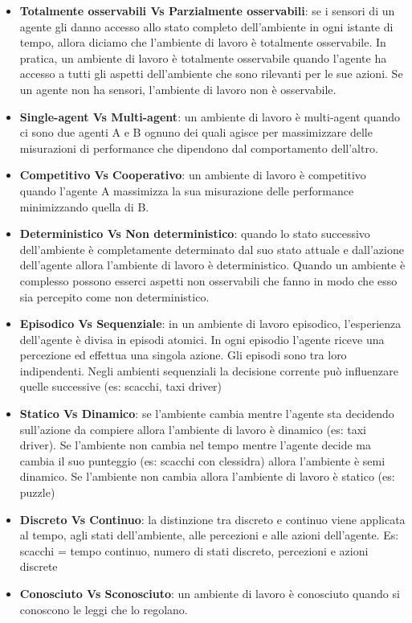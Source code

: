 \begin{itemize}
	\item \textbf{Totalmente osservabili Vs Parzialmente osservabili}:
	      se i
	      sensori di un agente gli danno accesso allo stato completo dell'ambiente
	      in ogni istante di tempo, allora diciamo che l'ambiente di lavoro
	      è totalmente osservabile. In pratica, un ambiente di lavoro è totalmente
	      osservabile quando l'agente ha accesso a tutti gli aspetti dell'ambiente
	      che sono rilevanti per le sue azioni.
	      Se un agente non ha sensori, l'ambiente di lavoro non è osservabile.
	\item \textbf{Single-agent Vs Multi-agent}:
	      un ambiente di lavoro è
	      multi-agent quando ci sono due agenti A e B ognuno dei quali agisce
	      per massimizzare delle misurazioni di performance che dipendono dal
	      comportamento dell'altro.
	\item \textbf{Competitivo Vs Cooperativo}:
	      un ambiente di lavoro è
	      competitivo quando l'agente A massimizza la sua misurazione delle
	      performance minimizzando quella di B.
	\item \textbf{Deterministico Vs Non deterministico}:
	      quando lo stato successivo dell'ambiente è completamente determinato dal suo stato attuale e dall'azione dell'agente allora l'ambiente di lavoro è deterministico. Quando un ambiente è complesso possono esserci aspetti non osservabili che fanno in modo che esso sia percepito come non deterministico.
	\item \textbf{Episodico Vs Sequenziale}:
	      in un ambiente di lavoro episodico, l'esperienza dell'agente è divisa in episodi atomici. In ogni episodio l'agente riceve una percezione ed effettua una singola azione. Gli episodi sono tra loro indipendenti. Negli ambienti sequenziali la decisione corrente può influenzare quelle successive (es: scacchi, taxi driver)
	\item \textbf{Statico Vs Dinamico}:
	      se l'ambiente cambia mentre l'agente sta decidendo sull'azione da compiere allora l'ambiente di lavoro è dinamico (es: taxi driver). Se l'ambiente non cambia nel tempo mentre l'agente decide ma cambia il suo punteggio (es: scacchi con clessidra) allora l'ambiente è semi dinamico. Se l'ambiente non cambia allora l'ambiente di lavoro è statico (es: puzzle)
	\item \textbf{Discreto Vs Continuo}:
	      la distinzione tra discreto e continuo viene applicata al tempo, agli stati dell'ambiente, alle percezioni e alle azioni dell'agente.
	      Es: scacchi = tempo continuo, numero di stati discreto, percezioni e azioni discrete
	\item \textbf{Conosciuto Vs Sconosciuto}:
	      un ambiente di lavoro è conosciuto quando si conoscono le leggi che lo regolano.
\end{itemize}

